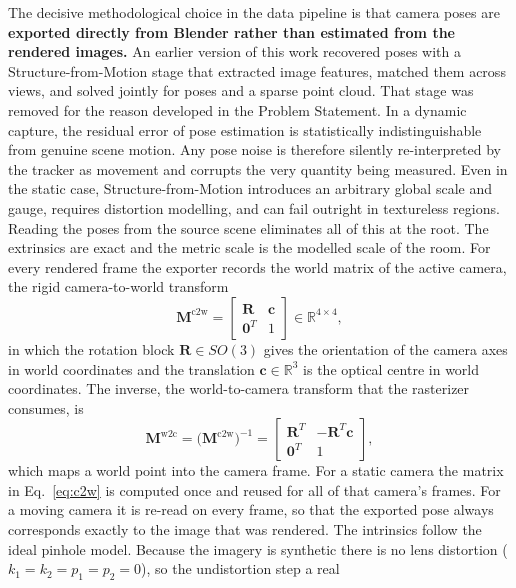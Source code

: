 The decisive methodological choice in the data pipeline is that camera poses are
\textbf{exported directly from Blender rather than estimated from the rendered
images.} An earlier version of this work recovered poses with a Structure-from-Motion
stage that extracted image features, matched them across views, and solved jointly
for poses and a sparse point cloud. That stage was removed for the reason developed
in the Problem Statement. In a dynamic capture, the residual error of pose estimation
is statistically indistinguishable from genuine scene motion. Any pose noise is
therefore silently re-interpreted by the tracker as movement and corrupts the very
quantity being measured. Even in the static case, Structure-from-Motion introduces an
arbitrary global scale and gauge, requires distortion modelling, and can fail
outright in textureless regions. Reading the poses from the source scene eliminates
all of this at the root. The extrinsics are exact  and
the metric scale is the modelled scale of the room. For every rendered frame the exporter records the world matrix of the active camera,
the rigid camera-to-world transform
\begin{equation}
    \mathbf{M}^{\text{c2w}} =
    \begin{bmatrix} \mathbf{R} & \mathbf{c} \\ \mathbf{0}^T & 1 \end{bmatrix}
    \in \mathbb{R}^{4\times4},
    \label{eq:c2w}
\end{equation}
in which the rotation block $\mathbf{R}\in SO(3)$ gives the orientation of the camera
axes in world coordinates and the translation $\mathbf{c}\in\mathbb{R}^3$ is the
optical centre in world coordinates. The inverse, the world-to-camera transform that
the rasterizer consumes, is
\begin{equation}
    \mathbf{M}^{\text{w2c}} = \big(\mathbf{M}^{\text{c2w}}\big)^{-1}
    = \begin{bmatrix} \mathbf{R}^T & -\mathbf{R}^T\mathbf{c} \\ \mathbf{0}^T & 1 \end{bmatrix},
\end{equation}
which maps a world point into the camera frame. For a static camera the matrix in
Eq.~\eqref{eq:c2w} is computed once and reused for all of that camera's frames. For a
moving camera it is re-read on every frame, so that the exported pose always
corresponds exactly to the image that was rendered. The intrinsics follow the ideal pinhole model. Because the imagery is synthetic there
is no lens distortion ($k_1 = k_2 = p_1 = p_2 = 0$), so the undistortion step a real
